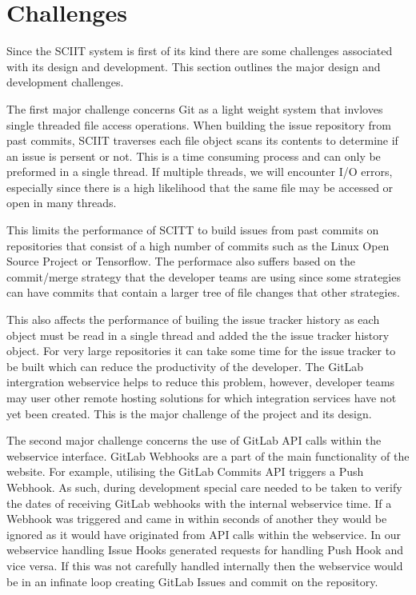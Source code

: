 \documentclass{mproj}
\begin{document}
\section{Challenges}

Since the SCIIT system is first of its kind there are some challenges associated with its design and development. This section outlines the major design and development challenges.

The first major challenge concerns Git as a light weight system that invloves single threaded file access operations. When building the issue repository from past commits, SCIIT traverses each file object scans its contents to determine if an issue is persent or not. This is a time consuming process and can only be preformed in a single thread. If multiple threads, we will encounter I/O errors, especially since there is a high likelihood that the same file may be accessed or open in many threads. 

This limits the performance of SCITT to build issues from past commits on repositories that consist of a high number of commits such as the Linux Open Source Project or Tensorflow. The performace also suffers based on the commit/merge strategy that the developer teams are using since some strategies can have commits that contain a larger tree of file changes that other strategies. 

This also affects the performance of builing the issue tracker history as each object must be read in a single thread and added the the issue tracker history object. For very large repositories it can take some time for the issue tracker to be built which can reduce the productivity of the developer. The GitLab intergration webservice helps to reduce this problem, however, developer teams may user other remote hosting solutions for which integration services have not yet been created. This is the major challenge of the project and its design.

The second major challenge concerns the use of GitLab API calls within the webservice interface. GitLab Webhooks are a part of the main functionality of the website. For example, utilising the GitLab Commits API triggers a Push Webhook. As such, during development special care needed to be taken to verify the dates of receiving GitLab webhooks with the internal webservice time. If a Webhook was triggered and came in within seconds of another they would be ignored as it would have originated from API calls within the webservice. In our webservice handling Issue Hooks generated requests for handling Push Hook and vice versa. If this was not carefully handled internally then the webservice would be in an infinate loop creating GitLab Issues and commit on the repository.
\end{document}
